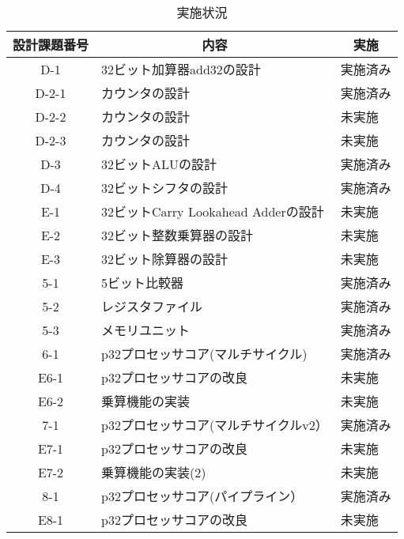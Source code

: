\documentclass{jarticle}[11pt]
\begin{document}
\begin{table*}[htb] %
\caption{実施状況}
\label{実施状況}
\begin{center}
\begin{tabular}{c|p{6cm}|p{4cm}}
\hline \hline
設計課題番号 & 
\multicolumn{1}{c}{内容} &
\multicolumn{1}{|c}{実施} 
\\ \hline

D-1 &
32ビット加算器add32の設計 &
実施済み 
\\

D-2-1 &
カウンタの設計 &
実施済み 
\\

D-2-2 &
カウンタの設計 &
未実施
\\

D-2-3 &
カウンタの設計 &
未実施
\\

D-3 &
32ビットALUの設計 &
実施済み
\\

D-4 &
32ビットシフタの設計 &
実施済み
\\

E-1 &
32ビットCarry Lookahead Adderの設計 &
未実施
\\

E-2 &
32ビット整数乗算器の設計 &
未実施
\\

E-3 &
32ビット除算器の設計 &
未実施
\\

5-1 &
5ビット比較器 &
実施済み
\\

5-2 &
レジスタファイル &
実施済み
\\

5-3 &
メモリユニット &
実施済み
\\

6-1 &
p32プロセッサコア(マルチサイクル) &
実施済み
\\

E6-1 &
p32プロセッサコアの改良 &
未実施
\\

E6-2 &
乗算機能の実装 &
未実施
\\

7-1 &
p32プロセッサコア(マルチサイクルv2） &
実施済み
\\

E7-1 &
p32プロセッサコアの改良 &
未実施
\\

E7-2 &
乗算機能の実装(2) &
未実施
\\

8-1 &
p32プロセッサコア(パイプライン） &
実施済み
\\

E8-1 &
p32プロセッサコアの改良 &
未実施
\\

\hline
\end{tabular}
\end{center}
\end{table*}
\end{document}
